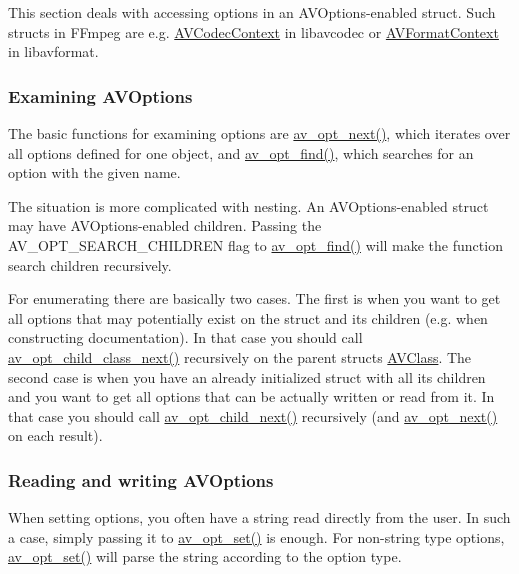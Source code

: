 This section deals with accessing options in an A\+V\+Options-\/enabled struct. Such structs in F\+Fmpeg are e.\+g. \hyperlink{struct_a_v_codec_context}{A\+V\+Codec\+Context} in libavcodec or \hyperlink{struct_a_v_format_context}{A\+V\+Format\+Context} in libavformat.\hypertarget{group__avoptions_avoptions_use_examine}{}\subsubsection{Examining A\+V\+Options}\label{group__avoptions_avoptions_use_examine}
The basic functions for examining options are \hyperlink{group__avoptions_ga78edbb7da1fdc8626d8a52f8ab7e7a0c}{av\+\_\+opt\+\_\+next()}, which iterates over all options defined for one object, and \hyperlink{group__avoptions_gae31ae7fb20113b00108d0ecf53f25664}{av\+\_\+opt\+\_\+find()}, which searches for an option with the given name.

The situation is more complicated with nesting. An A\+V\+Options-\/enabled struct may have A\+V\+Options-\/enabled children. Passing the A\+V\+\_\+\+O\+P\+T\+\_\+\+S\+E\+A\+R\+C\+H\+\_\+\+C\+H\+I\+L\+D\+R\+EN flag to \hyperlink{group__avoptions_gae31ae7fb20113b00108d0ecf53f25664}{av\+\_\+opt\+\_\+find()} will make the function search children recursively.

For enumerating there are basically two cases. The first is when you want to get all options that may potentially exist on the struct and its children (e.\+g. when constructing documentation). In that case you should call \hyperlink{group__avoptions_gadee1f425013a0f861a40a72d80f189b1}{av\+\_\+opt\+\_\+child\+\_\+class\+\_\+next()} recursively on the parent struct\textquotesingle{}s \hyperlink{struct_a_v_class}{A\+V\+Class}. The second case is when you have an already initialized struct with all its children and you want to get all options that can be actually written or read from it. In that case you should call \hyperlink{group__avoptions_gaacce30022d2e99c7b9309d3ad3345f69}{av\+\_\+opt\+\_\+child\+\_\+next()} recursively (and \hyperlink{group__avoptions_ga78edbb7da1fdc8626d8a52f8ab7e7a0c}{av\+\_\+opt\+\_\+next()} on each result).\hypertarget{group__avoptions_avoptions_use_get_set}{}\subsubsection{Reading and writing A\+V\+Options}\label{group__avoptions_avoptions_use_get_set}
When setting options, you often have a string read directly from the user. In such a case, simply passing it to \hyperlink{group__opt__set__funcs_ga5fd4b92bdf4f392a2847f711676a7537}{av\+\_\+opt\+\_\+set()} is enough. For non-\/string type options, \hyperlink{group__opt__set__funcs_ga5fd4b92bdf4f392a2847f711676a7537}{av\+\_\+opt\+\_\+set()} will parse the string according to the option type.

